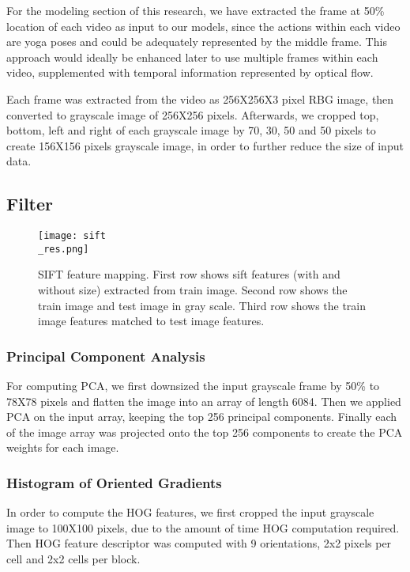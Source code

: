 \documentclass[
	a4paper, %
	10pt, %
	unnumberedsections, %
	twoside, %
]{t0004}
\begin{document}
For the modeling section of this research, we have extracted the frame at 50\% location of each video as input to our models, since the actions within each video are yoga poses and could be adequately represented by the middle frame. This approach would ideally be enhanced later to use multiple frames within each video, supplemented with temporal information represented by optical flow.

Each frame was extracted from the video as 256X256X3 pixel RBG image, then converted to grayscale image of 256X256 pixels. Afterwards, we cropped top, bottom, left and right of each grayscale image by 70, 30, 50 and 50 pixels to create 156X156 pixels grayscale image, in order to further reduce the size of input data.

\subsection{Filter}

\begin{figure}
	\texttt{[image: sift\\\_res.png]}
	\caption{SIFT feature mapping. First row shows sift features (with and without size) extracted from train image. Second row shows the train image and test image in gray scale. Third row shows the train image features matched to test image features.}
	\label{fig:siftres}
\end{figure}

\subsubsection{Principal Component Analysis} For computing PCA, we first downsized the input grayscale frame by 50\% to 78X78 pixels and flatten the image into an array of length 6084. Then we applied PCA on the input array, keeping the top 256 principal components. Finally each of the image array was projected onto the top 256 components to create the PCA weights for each image.

\subsubsection{Histogram of Oriented Gradients} In order to compute the HOG features, we first cropped the input grayscale image to 100X100 pixels, due to the amount of time HOG computation required. Then HOG feature descriptor was computed with 9 orientations, 2x2 pixels per cell and 2x2 cells per block.
\end{document}
